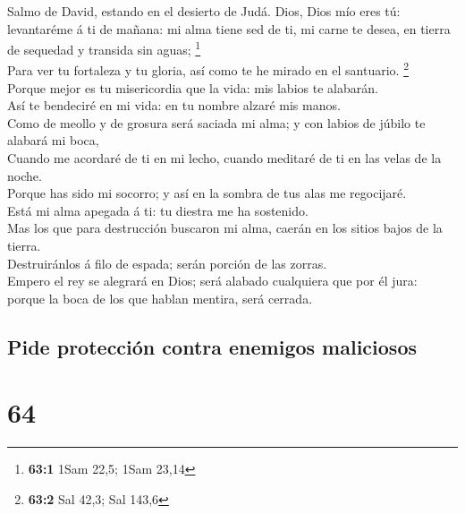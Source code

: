  Salmo de David, estando en el desierto de Judá. Dios, Dios
mío eres tú: levantaréme á ti de mañana: mi alma tiene sed de ti, mi
carne te desea, en tierra de sequedad y transida sin aguas;
\footnote{\textbf{63:1} 1Sam 22,5; 1Sam 23,14}\\
 Para ver tu fortaleza y tu gloria, así como te he mirado en
el santuario. \footnote{\textbf{63:2} Sal 42,3; Sal 143,6}\\
 Porque mejor es tu misericordia que la vida: mis labios te
alabarán.\\
 Así te bendeciré en mi vida: en tu nombre alzaré mis
manos.\\
 Como de meollo y de grosura será saciada mi alma; y con
labios de júbilo te alabará mi boca,\\
 Cuando me acordaré de ti en mi lecho, cuando meditaré de ti
en las velas de la noche.\\
 Porque has sido mi socorro; y así en la sombra de tus alas
me regocijaré.\\
 Está mi alma apegada á ti: tu diestra me ha sostenido.\\
 Mas los que para destrucción buscaron mi alma, caerán en
los sitios bajos de la tierra.\\
 Destruiránlos á filo de espada; serán porción de las
zorras.\\
 Empero el rey se alegrará en Dios; será alabado cualquiera
que por él jura: porque la boca de los que hablan mentira, será cerrada.

\hypertarget{pide-protecciuxf3n-contra-enemigos-maliciosos}{%
\subsection{Pide protección contra enemigos
maliciosos}\label{pide-protecciuxf3n-contra-enemigos-maliciosos}}

\hypertarget{section-63}{%
\section{64}\label{section-63}}

